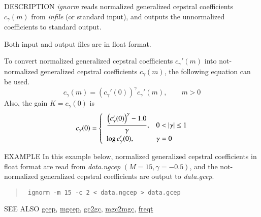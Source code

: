 \begin{qsection}{DESCRIPTION}
{\em ignorm} reads normalized generalized cepstral coefficients
$c_\gamma(m)$ from {\em infile} (or standard input), 
and outputs the unnormalized coefficients to standard output.

Both input and output files are in float format.

To convert normalized generalized cepstral coefficients
$c_\gamma'(m)$ into not-normalized generalized cepstral coefficients
$c_\gamma(m)$, the following equation can be used.
\begin{displaymath}
c_\gamma(m) = \left( c_\gamma'(0) \right)^{\gamma} c_\gamma'(m), \qquad m>0
\end{displaymath}
Also, the gain $K = c_\gamma(0)$ is
\begin{displaymath}
c_\gamma(0) = \begin{cases} \;\; \displaystyle
          \frac{\Bigl(c_\gamma'(0)\Bigr)^{\gamma} - 1.0}{\gamma},
                & 0<|\gamma|\leq 1 \\ \;\; \displaystyle
          \log c_\gamma'(0),  & \gamma=0
        \end{cases}
\end{displaymath}
\end{qsection}

\begin{options}
\end{options}

\begin{qsection}{EXAMPLE}
In this example below,
normalized generalized cepstral coefficients in
float format are read from {\em data.ngcep} $(M=15, \gamma=-0.5)$,
and the not-normalized generalized cepstral coefficients
are output to {\em data.gcep}.
\begin{quote}
 \verb! ignorm -m 15 -c 2 < data.ngcep > data.gcep!
\end{quote} 
\end{qsection}

\begin{qsection}{SEE ALSO}
\hyperlink{gcep}{gcep},
\hyperlink{mgcep}{mgcep},
\hyperlink{gc2gc}{gc2gc},
\hyperlink{mgc2mgc}{mgc2mgc},
\hyperlink{freqt}{freqt}
\end{qsection}
